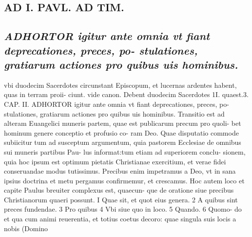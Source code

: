 \documentclass{article}
\begin{document}
\begin{pages}
\section*{AD I. PAVL. AD TIM. }
\marginpar{[ p.38 ]}\pstart {}
{}
\subsection*{\textit{ADHORTOR igitur ante omnia vt fiant deprecationes, preces, po- stulationes, gratiarum actiones pro quibus uis hominibus.}}vbi duodecim Sacerdotes circunstant Episcopum, et lucernas ardentes habent, quas in terram proii- ciunt. vide canon. Debent duodecim Sacerdotes 1I. quaest.3. CAP. II. ADHORTOR igitur ante omnia vt fiant deprecationes, preces, po- stulationes, gratiarum actiones pro quibus uis hominibus. Transitio est ad alteram Euangelici muneris partem, quae est publicarum precum pro quoli- bet hominum genere conceptio et profusio co- ram Deo. Quae disputatio commode subiicitur tum ad susceptum argumentum, quia pastorem Ecclesiae de omnibus sui muneris partibus Pau- lus informat:tum etiam ad superiorem conclu- sionem, quia hoc ipsum est optimum pietatis Christianae exercitium, et verae fidei conseruandae modus tutissimus. Precibus enim impetramus a Deo, vt in sana ipsius doctrina et metu pergamus confirmemur, et crescamus. Hoc autem loco et capite Paulus breuiter complexus est, quaecun- que de oratione siue precibus Christianorum quaeri possunt. I Quae sit, et quot eius genera. 2 A quibus sint preces fundendae. 3 Pro quibus 4 Vbi siue quo in loco. 5 Quando. 6 Quomo- do et qua cum animi reuerentia, et totius coetus decoro: quae singula suis locis a nobis (Domino  \pend
\textbf{}

\end{pages}
\end{document}
